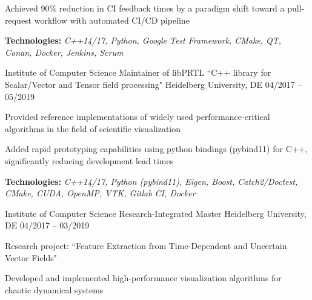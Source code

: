 \begin{cventries}
{\begin{cvitems}
        \item {Achieved 90\% reduction in CI feedback times by a paradigm shift toward a pull-request workflow with automated CI/CD pipeline}
        \item {\textbf{Technologies:} \textit{C++14/17, Python, Google Test Framework, CMake, QT, Conan, Docker, Jenkins, Scrum}}
      \end{cvitems}
    }
    \cventry
    {Institute of Computer Science }
    {Maintainer of libPRTL ``C++ library for Scalar/Vector and Tensor field processing"}
    {Heidelberg University, DE}
    {04/2017 -- 05/2019}
    {
      \begin{cvitems}
        \item {Provided reference implementations of widely used performance-critical algorithms in the field of scientific visualization}
        \item {Added rapid prototyping capabilities using python bindings (pybind11) for C++, significantly reducing development lead times}
        \item {\textbf{Technologies:} \textit{C++14/17, Python (pybind11), Eigen, Boost, Catch2/Doctest, CMake, CUDA, OpenMP, VTK, Gitlab CI, Docker}}
      \end{cvitems}
    }
    \cventry
    {Institute of Computer Science}
    {Research-Integrated Master }
    {Heidelberg University, DE}
    {04/2017 -- 03/2019}
    {
      \begin{cvitems}
        \item {Research project: ``Feature Extraction from Time-Dependent and Uncertain Vector Fields"}
        \item {Developed and implemented high-performance visualization algorithms for chaotic dynamical systems}

\end{cvitems}}
\end{cventries}
